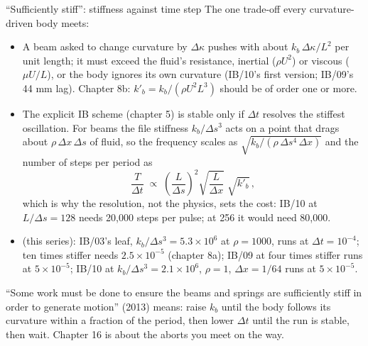 \documentclass[aspectratio=169,11pt]{beamer}
\begin{document}
\begin{frame}{``Sufficiently stiff'': stiffness against time step}
\label{fr:stiff}
\vspace{-2mm}
\footnotesize The one trade-off every curvature-driven body meets:
\begin{itemize}
  \item {} A beam asked to change curvature by $\Delta\kappa$ pushes with about $k_b\,\Delta\kappa/L^2$ per unit length; it must exceed the fluid's resistance, inertial ($\rho U^2$) or viscous ($\mu U/L$), or the body ignores its own curvature (IB/10's first version; IB/09's 44 mm lag). Chapter 8b: $k'_b = k_b/(\rho U^2 L^3)$ should be of order one or more.
  \item {} The explicit IB scheme (chapter 5) is stable only if $\Delta t$ resolves the stiffest oscillation. For beams the file stiffness $k_b/\Delta s^3$ acts on a point that drags about $\rho\,\Delta x\,\Delta s$ of fluid, so the frequency scales as $\sqrt{k_b/(\rho\,\Delta s^4\,\Delta x)}$ and the number of steps per period as
  \[
    \frac{T}{\Delta t} \;\propto\; \left(\frac{L}{\Delta s}\right)^2 \sqrt{\frac{L}{\Delta x}}\;\sqrt{k'_b}\,,
  \]
  which is why the resolution, not the physics, sets the cost: IB/10 at $L/\Delta s = 128$ needs 20,000 steps per pulse; at 256 it would need 80,000.
  \item {} (this series): IB/03's leaf, $k_b/\Delta s^3 = 5.3\times10^6$ at $\rho = 1000$, runs at $\Delta t = 10^{-4}$; ten times stiffer needs $2.5\times10^{-5}$ (chapter 8a); IB/09 at four times stiffer runs at $5\times10^{-5}$; IB/10 at $k_b/\Delta s^3 = 2.1\times10^6$, $\rho = 1$, $\Delta x = 1/64$ runs at $5\times10^{-5}$.
\end{itemize}
\begin{punchbox}
\scriptsize ``Some work must be done to ensure the beams and springs are sufficiently stiff in order to generate motion'' (2013) means: raise $k_b$ until the body follows its curvature within a fraction of the period, then lower $\Delta t$ until the run is stable, then wait. Chapter 16 is about the aborts you meet on the way.
\end{punchbox}
\end{frame}
\end{document}
